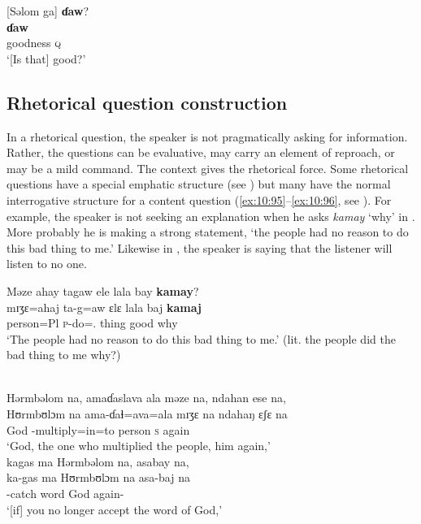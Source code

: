 \ea \label{ex:10:94}
{}[Səlom ga]  \textbf{ɗaw}?\\
\gll  [sʊlɔm  ga] \textbf{ɗaw}\\
      goodness  {\ADJ}  {\textsc{q}}\\
\glt  ‘[Is that] good?’              
\z 

\subsection{Rhetorical question construction}\label{sec:10.3.4}
\hypertarget{RefHeading1213061525720847}{}
In a rhetorical question, the speaker is not pragmatically asking for information. Rather, the questions can be evaluative, may carry an element of reproach, or may be a mild command. The context gives the rhetorical force. Some rhetorical questions have a special emphatic structure (see ) but many have the normal interrogative structure for a content question (\ref{ex:10:95}–\ref{ex:10:96}, see ). For example, the speaker is not seeking an explanation when he asks \textit{kamay} ‘why’ in . More probably he is making a strong statement, ‘the people had no reason to do this bad thing to me.’ Likewise in , the speaker is saying that the listener will listen to no one. 

\ea \label{ex:10:95}
Məze  ahay  tagaw  ele  lala  bay  \textbf{kamay}?\\
\gll  mɪʒɛ=ahaj  ta-g=aw  ɛlɛ  lala  baj  \textbf{kamaj}\\
      person=Pl  \textsc{p}-do={\oneS}.{\IO}  thing  good  {\NEG}  why\\
\glt  ‘The people had no reason to do this bad thing to me.’ (lit. the people did the bad thing to me why?)
\z 

\ea \label{ex:10:96}
\\
Hərmbəlom  na,  amaɗaslava  ala  məze  na,  ndahan  ese  na,\\   
\gll  Hʊrmbʊlɔm  na  ama-ɗaɬ=ava=ala  mɪʒɛ   na  ndahaŋ  ɛʃɛ na \\ 
      God  {\PSP}    {\DEP}-multiply=in=to   person   {\PSP}     \textsc{s}     again    {\PSP} \\     
\glt ‘God, the one who multiplied the people, him again,’\\
      
      \medskip
kagas  ma  Hərmbəlom  na,  asabay  na,\\       
\gll ka-gas ma Hʊrmbʊlɔm na asa-baj na \\ 
     {\twoS}-catch   word     God             {\PSP}  again-{\NEG}  {\PSP} \\ 
\glt ‘[if] you no longer accept the word of God,’\\ 

